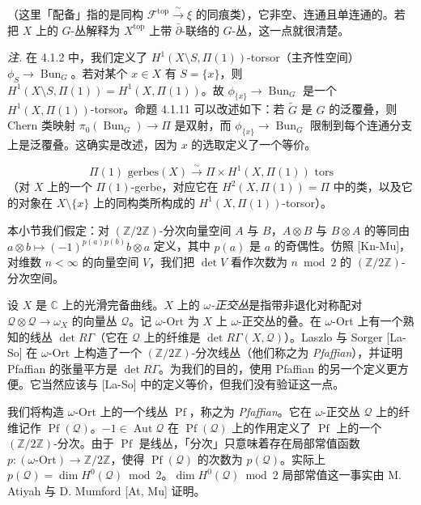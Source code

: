 （这里「配备」指的是同构 $\mathcal{F}^{\mathrm{top}}\xrightarrow{\ \sim\ }\xi$ 的同痕类），它非空、连通且单连通的。若把 $X$ 上的 $G$-丛解释为 $X^{\mathrm{top}}$ 上带 $\bar\partial$-联络的 $G$-丛，这一点就很清楚。

\emph{注.} 在 4.1.2 中，我们定义了 $H^{1}(X\setminus S,\Pi(1))$-torsor（主齐性空间）$\phi_{S}\to\operatorname{Bun}_{G}$。若对某个 $x\in X$ 有 $S=\{x\}$，则 $H^{1}(X\setminus S,\Pi(1))=H^{1}(X,\Pi(1))$。故 $\phi_{\{x\}}\to\operatorname{Bun}_{G}$ 是一个 $H^{1}(X,\Pi(1))$-torsor。命题 4.1.11 可以改述如下：若 $\tilde{G}$ 是 $G$ 的泛覆叠，则 Chern 类映射 $\pi_{0}(\operatorname{Bun}_{G})\to\Pi$ 是双射，而 $\phi_{\{x\}}\to\operatorname{Bun}_{G}$ 限制到每个连通分支上是泛覆叠。这确实是改述，因为 $x$ 的选取定义了一个等价。

\begin{equation}\tag{163}
\Pi(1)\text{ gerbes}(X)\xrightarrow{\ \sim\ }\Pi\times H^{1}(X,\Pi(1))\text{ tors}
\end{equation}
（对 $X$ 上的一个 $\Pi(1)$-gerbe，对应它在 $H^{2}(X,\Pi(1))=\Pi$ 中的类，以及它的对象在 $X\setminus\{x\}$ 上的同构类所构成的 $H^{1}(X,\Pi(1))$-torsor）。


本小节我们假定：对 $(\mathbb{Z}/2\mathbb{Z})$-分次向量空间 $A$ 与 $B$，$A\otimes B$ 与 $B\otimes A$ 的等同由 $a\otimes b\mapsto(-1)^{p(a)p(b)}b\otimes a$ 定义，其中 $p(a)$ 是 $a$ 的奇偶性。仿照 [Kn-Mu]，对维数 $n<\infty$ 的向量空间 $V$，我们把 $\det V$ 看作次数为 $n\bmod 2$ 的 $(\mathbb{Z}/2\mathbb{Z})$-分次空间。

 设 $X$ 是 $\mathbb{C}$ 上的光滑完备曲线。$X$ 上的 \emph{$\omega$-正交丛}是指带非退化对称配对 $\mathcal{Q}\otimes\mathcal{Q}\to\omega_{X}$ 的向量丛 $\mathcal{Q}$。记 $\omega\text{-Ort}$ 为 $X$ 上 $\omega$-正交丛的叠。在 $\omega\text{-Ort}$ 上有一个熟知的线丛 $\det R\Gamma$（它在 $\mathcal{Q}$ 上的纤维是 $\det R\Gamma(X,\mathcal{Q})$）。Laszlo 与 Sorger [La-So] 在 $\omega\text{-Ort}$ 上构造了一个 $(\mathbb{Z}/2\mathbb{Z})$-分次线丛（他们称之为 \emph{Pfaffian}），并证明 Pfaffian 的张量平方是 $\det R\Gamma$。为我们的目的，使用 Pfaffian 的另一个定义更方便。它当然应该与 [La-So] 中的定义等价，但我们没有验证这一点。

我们将构造 $\omega\text{-Ort}$ 上的一个线丛 $\operatorname{Pf}$，称之为 \emph{Pfaffian}。它在 $\omega$-正交丛 $\mathcal{Q}$ 上的纤维记作 $\operatorname{Pf}(\mathcal{Q})$。$-1\in\operatorname{Aut}\mathcal{Q}$ 在 $\operatorname{Pf}(\mathcal{Q})$ 上的作用定义了 $\operatorname{Pf}$ 上的一个 $(\mathbb{Z}/2\mathbb{Z})$-分次。由于 $\operatorname{Pf}$ 是线丛，「分次」只意味着存在局部常值函数 $p:(\omega\text{-Ort})\to\mathbb{Z}/2\mathbb{Z}$，使得 $\operatorname{Pf}(\mathcal{Q})$ 的次数为 $p(\mathcal{Q})$。实际上 $p(\mathcal{Q})=\dim H^{0}(\mathcal{Q})\bmod 2$。$\dim H^{0}(\mathcal{Q})\bmod 2$ 局部常值这一事实由 M. Atiyah 与 D. Mumford [At, Mu] 证明。

